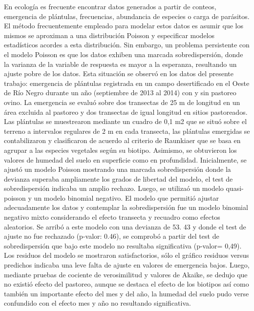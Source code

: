 {En ecología es frecuente encontrar datos generados a partir de conteos, emergencia de plántulas, frecuencias, abundancia de especies o carga de parásitos. El método frecuentemente empleado para modelar estos datos es asumir que los mismos se aproximan a una distribución Poisson y especificar modelos estadísticos acordes a esta distribución. Sin embargo, un problema persistente con el modelo Poisson es que los datos exhiben una marcada sobredispersión, donde la varianza de la variable de respuesta es mayor a la esperanza, resultando un ajuste pobre de los datos. Esta situación se observó en los datos del presente trabajo: emergencia de plántulas registrada en un campo desertificado en el Oeste de Río Negro durante un año (septiembre de 2013 al 2014) con y sin pastoreo ovino. La emergencia se evaluó sobre dos transectas de 25 m de longitud en un área excluida al pastoreo y dos transectas de igual longitud en sitios pastoreados. Las plántulas se muestrearon mediante un cuadro de 0,1 m2 que se situó sobre el terreno a intervalos regulares de 2 m en cada transecta, las plántulas emergidas se contabilizaron y clasificaron de acuerdo al criterio de Raunkiaer que se basa en agrupar a las especies vegetales según su biotipo. Asimismo, se obtuvieron los valores de humedad del suelo en superficie como en profundidad. Inicialmente, se ajustó un modelo Poisson mostrando una marcada sobredispersión donde la devianza superaba ampliamente los grados de libertad del modelo, el test de sobredispersión indicaba un amplio rechazo. Luego, se utilizaó un modelo quasi-poisson y un modelo binomial negativo. El modelo que permitió ajustar adecuadamente los datos y contemplar la sobredispersión fue un modelo binomial negativo mixto considerando el efecto transecta y recuadro como efectos aleatorios. Se arribó a este modelo con una devianza de 53. 43 y donde el test de ajuste no fue rechazado (p-valor: 0.46), se comprobó a partir del test de sobredispersión que bajo este modelo no resultaba significativa (p-valor= 0,49). Los residuos del modelo se mostraron satisfactorios, sólo el gráfico residuos versus predichos indicaba una leve falta de ajuste en valores de emergencia bajos. Luego, mediante pruebas de cociente de verosimilitud y valores de Akaike, se dedujo que no existió efecto del pastoreo, aunque se destaca el efecto de los biotipos así como también un importante efecto del mes y del año, la humedad del suelo pudo verse confundido con el efecto mes y año no resultando significativa.}
